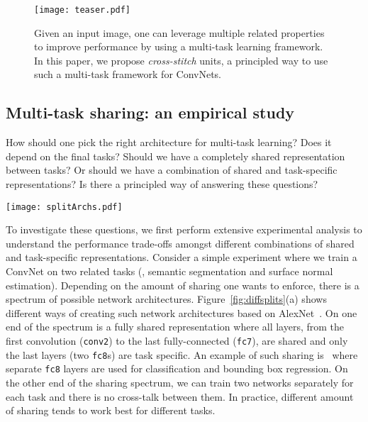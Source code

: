 \documentclass[10pt,twocolumn,letterpaper]{article}
\begin{document}
\begin{figure}[t]
\centering 
\texttt{[image: teaser.pdf]}
\caption{Given an input image, one can leverage multiple related properties to improve performance by using a multi-task learning framework. In this paper, we propose \emph{cross-stitch} units, a principled way to use such a multi-task framework for ConvNets.}
\label{fig:teaser}
\end{figure}

\subsection{Multi-task sharing: an empirical study}
\label{sec:intro-study}
How should one pick the right architecture for multi-task learning? Does it depend on the final tasks? Should we have a completely shared representation between tasks? Or should we have a combination of shared and task-specific representations? Is there a principled way of answering these questions?

\begin{figure*}[t]
\centering
\texttt{[image: splitArchs.pdf]}
\caption{We train a variety of multi-task (two-task) architectures by splitting at different layers in a ConvNet~\cite{alexnet} for two pairs of tasks. For each of these networks, we plot their performance on each task relative to the task-specific network. We notice that the best performing multi-task architecture depends on the individual tasks and does not transfer across different pairs of tasks.}
\label{fig:diffsplits}
\vspace{-0.1in}
\end{figure*}


To investigate these questions, we first perform extensive experimental analysis to understand the performance trade-offs amongst different combinations of shared and task-specific representations. Consider a simple experiment where we train a ConvNet on two related tasks (\eg, semantic segmentation and surface normal estimation). Depending on the amount of sharing one wants to enforce, there is a spectrum of possible network architectures. Figure~\ref{fig:diffsplits}(a) shows different ways of creating such network architectures based on AlexNet~\cite{alexnet}. On one end of the spectrum is a fully shared representation where all layers, from the first convolution (\texttt{conv2}) to the last fully-connected (\texttt{fc7}), are shared and only the last layers (two \texttt{fc8}s) are task specific. An example of such sharing is~\cite{fast-rcnn} where separate \texttt{fc8} layers are used for classification and bounding box regression. On the other end of the sharing spectrum, we can train two networks separately for each task and there is no cross-talk between them. In practice, different amount of sharing tends to work best for different tasks.
\end{document}
